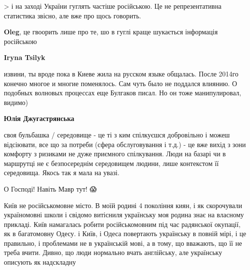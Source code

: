 \begin{itemize}
\begin{itemize}
> і на заході України гуглять частіше російською. Це не репрезентативна
статистика звісно, але вже про щось говорить.

\textbf{Oleg}, це гвоорить лише про те, шо в гуглі краще шукається інформація російською

 
\textbf{Iryna Tsilyk} 

извини, ты вроде пока в Киеве жила на русском языке общалась. После 2014го
конечно многое и многие поменялось. Сам чуть было не поддался влиянию. О
подобных волновых процессах еще Булгаков писал. Но он тоже манипулировал,
видимо)

 

\textbf{Юлія Джугастрянська} 

своя бульбашка / середовище - це ті з ким спілкуєшся добровільно і можеш
відсіювати, все що за потреби (сфера обслуговування і т.д.) - це вже вихід з
зони комфорту з ризиками не дуже приємного спілкування. Люди на базарі чи в
маршрутці не є безпосереднім середовищем людини, лише контекстом її середовища.
Якось так я мала на увазі.


 
О Господі! Навіть Мавр тут! 😱

\end{itemize}

 

Київ не російськомовне місто. В моїй родині 4 покоління киян, і як скорочували
україномовні школи і свідомо витісниля українську моя родина знає на власному
прикладі. Київ намагалась робити російськомовним під час радянської окупації,
як в багатомовну Одесу. і Київ, і Одеса повертають українську в повній мірі, і
це правильно, і проблемами не в українській мові, а в тому, що вважають, що її
не треба вчити. Дивно, що люди нормально вчать англійську, але українську
описують як надскладну


\end{itemize}
